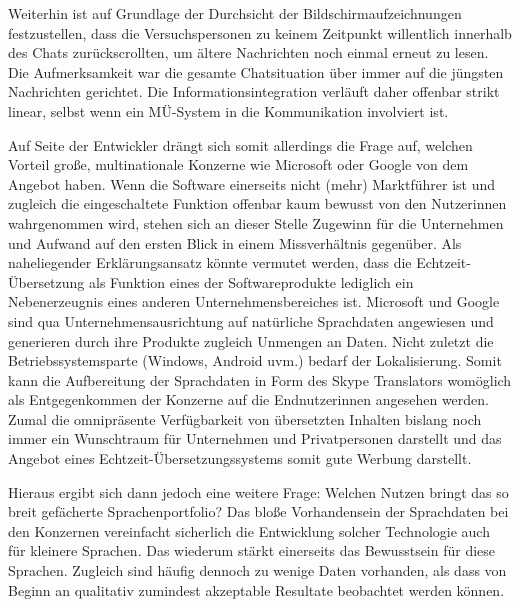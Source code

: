 Weiterhin ist auf Grundlage der Durchsicht der Bildschirmaufzeichnungen festzustellen, dass die Versuchspersonen zu keinem Zeitpunkt willentlich innerhalb des Chats zurückscrollten, um ältere Nachrichten noch einmal erneut zu lesen. Die Aufmerksamkeit war die gesamte Chatsituation über immer auf die jüngsten Nachrichten gerichtet. Die Informationsintegration verläuft daher offenbar strikt linear, selbst wenn ein MÜ-System in die Kommunikation involviert ist.

\begin{sloppypar}
Auf Seite der Entwickler drängt sich somit allerdings die Frage auf, welchen Vorteil große, multinationale Konzerne wie Microsoft oder Google von dem Angebot haben. Wenn die Software einerseits nicht (mehr) Marktführer ist und zugleich die eingeschaltete Funktion offenbar kaum bewusst von den Nutzer{\textperiodcentered}innen wahrgenommen wird, stehen sich an dieser Stelle Zugewinn für die Unternehmen und Aufwand auf den ersten Blick in einem Missverhältnis gegenüber. Als naheliegender Erklärungsansatz könnte vermutet werden, dass die Echt\-zeit-Über\-setz\-ung als Funktion eines der Softwareprodukte lediglich ein Nebenerzeugnis eines anderen Unternehmensbereiches ist. Microsoft und Google sind qua Unternehmensausrichtung auf natürliche Sprachdaten angewiesen und generieren durch ihre Produkte zugleich Unmengen an Daten. Nicht zuletzt die Betriebssystemsparte (Windows, Android uvm.) bedarf der Lokalisierung. Somit kann die Aufbereitung der Sprachdaten in Form des Skype Translators womöglich als Entgegenkommen der Konzerne auf die Endnutzer{\textperiodcentered}innen angesehen werden. Zumal die omnipräsente Verfügbarkeit von übersetzten Inhalten bislang noch immer ein Wunschtraum für Unternehmen und Privatpersonen darstellt und das Angebot eines Echtzeit-Übersetzungssystems somit gute Werbung darstellt.
\end{sloppypar}

Hieraus ergibt sich dann jedoch eine weitere Frage: Welchen Nutzen bringt das so breit gefächerte Sprachenportfolio? Das bloße Vorhandensein der Sprachdaten bei den Konzernen vereinfacht sicherlich die Entwicklung solcher Technologie auch für \glqq kleinere\grqq{} Sprachen. Das wiederum stärkt einerseits das Bewusstsein für diese Sprachen. Zugleich sind häufig dennoch zu wenige Daten vorhanden, als dass von Beginn an qualitativ zumindest akzeptable Resultate beobachtet werden können. 

